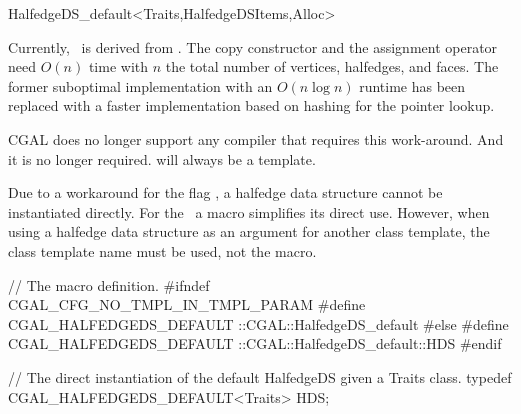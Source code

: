 \begin{ccRefClass}{HalfedgeDS_default<Traits,HalfedgeDSItems,Alloc>}
\ccImplementation

Currently, \ccRefName\ is derived from .
The copy constructor and the assignment operator need $O(n)$ time with
$n$ the total number of vertices, halfedges, and faces. The former 
suboptimal implementation with an $O(n \log n)$ runtime has been replaced
with a faster implementation based on hashing for the pointer lookup.

CGAL does no longer support any compiler that requires this
work-around. And it is no longer required. \ccRefName will always be a
template.

\begin{ccDeprecated}

Due to a workaround for the flag ,
a halfedge data structure cannot be instantiated directly. For the
\ccRefName\ a macro simplifies its direct use. However, when using a
halfedge data structure as an argument for another class template,
the class template name  must be used, not 
the macro.

\begin{ccExampleCode}
// The macro definition.
#ifndef CGAL_CFG_NO_TMPL_IN_TMPL_PARAM
    #define CGAL_HALFEDGEDS_DEFAULT  ::CGAL::HalfedgeDS_default
#else
    #define CGAL_HALFEDGEDS_DEFAULT  ::CGAL::HalfedgeDS_default::HDS
#endif

// The direct instantiation of the default HalfedgeDS given a Traits class.
typedef CGAL_HALFEDGEDS_DEFAULT<Traits> HDS;
\end{ccExampleCode}
  
\end{ccDeprecated}


\end{ccRefClass}

\ccRefPageEnd

